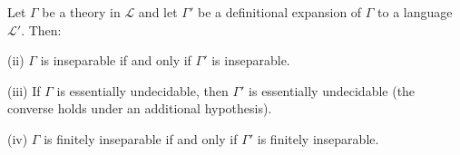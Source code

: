 Let $\Gamma$ be a theory in $\mathcal{L}$ and let $\Gamma'$ be a definitional expansion of $\Gamma$ to a language $\mathcal{L}'$. Then:

(ii) $\Gamma$ is inseparable if and only if $\Gamma'$ is inseparable.

(iii) If $\Gamma$ is essentially undecidable, then $\Gamma'$ is essentially undecidable (the converse holds under an additional hypothesis).

(iv) $\Gamma$ is finitely inseparable if and only if $\Gamma'$ is finitely inseparable.
